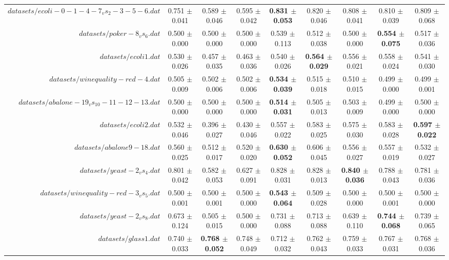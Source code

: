 \begin{table}[!ht]
{\begin{tabular}{r c c c c c c c c}
$datasets/ecoli-0-1-4-7_vs_2-3-5-6.dat$ & 0.751 $\pm$ 0.041 & 0.589 $\pm$ 0.046 & 0.595 $\pm$ 0.042 & \textbf{0.831 $\pm$ 0.053} & 0.820 $\pm$ 0.046 & 0.808 $\pm$ 0.041 & 0.810 $\pm$ 0.039 & 0.809 $\pm$ 0.068 \\
$datasets/poker-8_vs_6.dat$ & 0.500 $\pm$ 0.000 & 0.500 $\pm$ 0.000 & 0.500 $\pm$ 0.000 & 0.539 $\pm$ 0.113 & 0.512 $\pm$ 0.038 & 0.500 $\pm$ 0.000 & \textbf{0.554 $\pm$ 0.075} & 0.517 $\pm$ 0.036 \\
$datasets/ecoli1.dat$ & 0.530 $\pm$ 0.026 & 0.457 $\pm$ 0.035 & 0.463 $\pm$ 0.036 & 0.540 $\pm$ 0.026 & \textbf{0.564 $\pm$ 0.029} & 0.556 $\pm$ 0.021 & 0.558 $\pm$ 0.024 & 0.541 $\pm$ 0.030 \\
$datasets/winequality-red-4.dat$ & 0.505 $\pm$ 0.009 & 0.502 $\pm$ 0.006 & 0.502 $\pm$ 0.006 & \textbf{0.534 $\pm$ 0.039} & 0.515 $\pm$ 0.018 & 0.510 $\pm$ 0.015 & 0.499 $\pm$ 0.000 & 0.499 $\pm$ 0.001 \\
$datasets/abalone-19_vs_10-11-12-13.dat$ & 0.500 $\pm$ 0.000 & 0.500 $\pm$ 0.000 & 0.500 $\pm$ 0.000 & \textbf{0.514 $\pm$ 0.031} & 0.505 $\pm$ 0.013 & 0.503 $\pm$ 0.009 & 0.499 $\pm$ 0.000 & 0.500 $\pm$ 0.000 \\
$datasets/ecoli2.dat$ & 0.532 $\pm$ 0.046 & 0.396 $\pm$ 0.027 & 0.430 $\pm$ 0.046 & 0.557 $\pm$ 0.022 & 0.583 $\pm$ 0.025 & 0.575 $\pm$ 0.030 & 0.583 $\pm$ 0.028 & \textbf{0.597 $\pm$ 0.022} \\
$datasets/abalone9-18.dat$ & 0.560 $\pm$ 0.025 & 0.512 $\pm$ 0.017 & 0.520 $\pm$ 0.020 & \textbf{0.630 $\pm$ 0.052} & 0.606 $\pm$ 0.045 & 0.556 $\pm$ 0.027 & 0.557 $\pm$ 0.019 & 0.532 $\pm$ 0.027 \\
$datasets/yeast-2_vs_4.dat$ & 0.801 $\pm$ 0.042 & 0.582 $\pm$ 0.053 & 0.627 $\pm$ 0.091 & 0.828 $\pm$ 0.031 & 0.828 $\pm$ 0.013 & \textbf{0.840 $\pm$ 0.036} & 0.788 $\pm$ 0.043 & 0.781 $\pm$ 0.036 \\
$datasets/winequality-red-3_vs_5.dat$ & 0.500 $\pm$ 0.001 & 0.500 $\pm$ 0.001 & 0.500 $\pm$ 0.000 & \textbf{0.543 $\pm$ 0.064} & 0.509 $\pm$ 0.028 & 0.500 $\pm$ 0.000 & 0.500 $\pm$ 0.001 & 0.500 $\pm$ 0.000 \\
$datasets/yeast-2_vs_8.dat$ & 0.673 $\pm$ 0.124 & 0.505 $\pm$ 0.015 & 0.500 $\pm$ 0.000 & 0.731 $\pm$ 0.088 & 0.713 $\pm$ 0.088 & 0.639 $\pm$ 0.110 & \textbf{0.744 $\pm$ 0.068} & 0.739 $\pm$ 0.065 \\
$datasets/glass1.dat$ & 0.740 $\pm$ 0.033 & \textbf{0.768 $\pm$ 0.052} & 0.748 $\pm$ 0.049 & 0.712 $\pm$ 0.032 & 0.762 $\pm$ 0.043 & 0.759 $\pm$ 0.033 & 0.767 $\pm$ 0.031 & 0.768 $\pm$ 0.036 \\

\end{tabular}}
\end{table}
